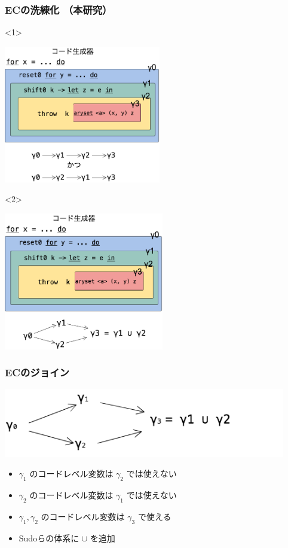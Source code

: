 \begin{frame}
  \frametitle{ECの洗練化 （本研究）}
  \begin{onlyenv}<1>
    \begin{center}
      \includegraphics[clip,height=6cm]{./img/ecex_katsu.png}
    \end{center}
  \end{onlyenv}

  \begin{onlyenv}<2>
    \begin{center}
      \includegraphics[clip,height=6cm]{./img/ecex_join.png}
    \end{center}
  \end{onlyenv}
\end{frame}


\begin{frame}
  \frametitle{ECのジョイン}
  \flushleft
  \includegraphics[clip,height=3cm]{./img/ecgraph.png}
  \begin{itemize}
  \item<2-> $\gamma_1$ のコードレベル変数は $\gamma_2$ では使えない
  \item<3-> $\gamma_2$ のコードレベル変数は $\gamma_1$ では使えない
  \item<4-> $\gamma_1, \gamma_2$ のコードレベル変数は $\gamma_3$ で使える
  \item<5->[$\Rightarrow$] Sudoらの体系に $\cup$ を追加
  \end{itemize}
\end{frame}

